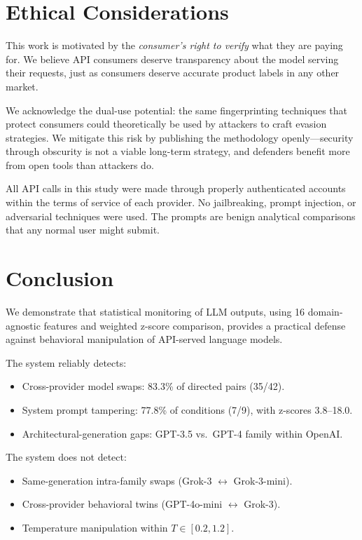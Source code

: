 \documentclass[11pt,twocolumn]{article}
\begin{document}
\section{Ethical Considerations}
\label{sec:ethics}

This work is motivated by the \emph{consumer's right to verify} what they are paying for.
We believe API consumers deserve transparency about the model serving their requests, just as consumers deserve accurate product labels in any other market.

We acknowledge the dual-use potential: the same fingerprinting techniques that protect consumers could theoretically be used by attackers to craft evasion strategies.
We mitigate this risk by publishing the methodology openly---security through obscurity is not a viable long-term strategy, and defenders benefit more from open tools than attackers do.

All API calls in this study were made through properly authenticated accounts within the terms of service of each provider.
No jailbreaking, prompt injection, or adversarial techniques were used.
The prompts are benign analytical comparisons that any normal user might submit.

\section{Conclusion}
\label{sec:conclusion}

We demonstrate that statistical monitoring of LLM outputs, using 16 domain-agnostic features and weighted z-score comparison, provides a practical defense against behavioral manipulation of API-served language models.

The system reliably detects:
\begin{itemize}[nosep]
    \item Cross-provider model swaps: 83.3\% of directed pairs (35/42).
    \item System prompt tampering: 77.8\% of conditions (7/9), with z-scores 3.8--18.0.
    \item Architectural-generation gaps: GPT-3.5 vs.\ GPT-4 family within OpenAI.
\end{itemize}

The system does not detect:
\begin{itemize}[nosep]
    \item Same-generation intra-family swaps (Grok-3 $\leftrightarrow$ Grok-3-mini).
    \item Cross-provider behavioral twins (GPT-4o-mini $\leftrightarrow$ Grok-3).
    \item Temperature manipulation within $T \in [0.2, 1.2]$.
\end{itemize}
\end{document}
